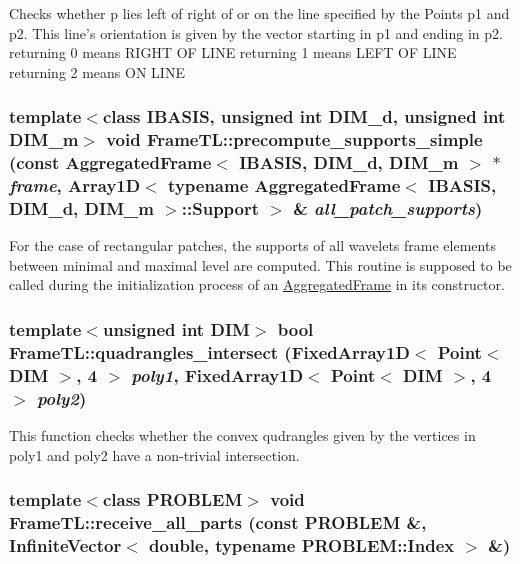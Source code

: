 Checks whether p lies left of right of or on the line specified by the Points p1 and p2. This line's orientation is given by the vector starting in p1 and ending in p2. returning 0 means RIGHT OF LINE returning 1 means LEFT OF LINE returning 2 means ON LINE \hypertarget{namespaceFrameTL_d92777b6b7c3d1dc873761d9280ec994}{
\subsubsection[precompute\_\-supports\_\-simple]{\setlength{\rightskip}{0pt plus 5cm}template$<$class IBASIS, unsigned int DIM\_\-d, unsigned int DIM\_\-m$>$ void FrameTL::precompute\_\-supports\_\-simple (const AggregatedFrame$<$ IBASIS, DIM\_\-d, DIM\_\-m $>$ $\ast$ {\em frame}, \/  Array1D$<$ typename AggregatedFrame$<$ IBASIS, DIM\_\-d, DIM\_\-m $>$::Support $>$ \& {\em all\_\-patch\_\-supports})}}
\label{namespaceFrameTL_d92777b6b7c3d1dc873761d9280ec994}


For the case of rectangular patches, the supports of all wavelets frame elements between minimal and maximal level are computed. This routine is supposed to be called during the initialization process of an \hyperlink{classFrameTL_1_1AggregatedFrame}{AggregatedFrame} in its constructor. \hypertarget{namespaceFrameTL_0f4762cff5b194a929e2eadddbfd0d71}{
\subsubsection[quadrangles\_\-intersect]{\setlength{\rightskip}{0pt plus 5cm}template$<$unsigned int DIM$>$ bool FrameTL::quadrangles\_\-intersect (FixedArray1D$<$ Point$<$ DIM $>$, 4 $>$ {\em poly1}, \/  FixedArray1D$<$ Point$<$ DIM $>$, 4 $>$ {\em poly2})}}
\label{namespaceFrameTL_0f4762cff5b194a929e2eadddbfd0d71}


This function checks whether the convex qudrangles given by the vertices in poly1 and poly2 have a non-trivial intersection. \hypertarget{namespaceFrameTL_3ea47092508598512ecc54955117a16f}{
\subsubsection[receive\_\-all\_\-parts]{\setlength{\rightskip}{0pt plus 5cm}template$<$class PROBLEM$>$ void FrameTL::receive\_\-all\_\-parts (const PROBLEM \&, \/  InfiniteVector$<$ double, typename PROBLEM::Index $>$ \&)}}
\label{namespaceFrameTL_3ea47092508598512ecc54955117a16f}


